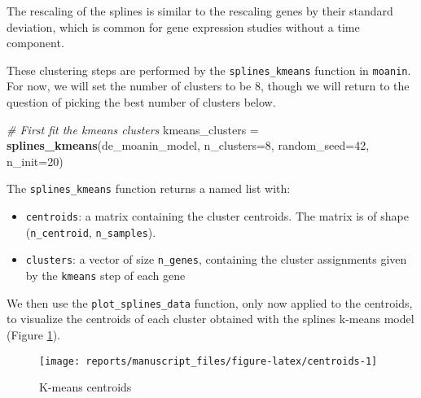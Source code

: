 \documentclass[9pt,a4paper,]{extarticle}
\newenvironment{Shaded}{\begin{snugshade}}{\end{snugshade}}
\newcommand{\CommentTok}[1]{\textcolor[rgb]{0.56,0.35,0.01}{\textit{#1}}}
\newcommand{\DataTypeTok}[1]{\textcolor[rgb]{0.13,0.29,0.53}{#1}}
\newcommand{\DecValTok}[1]{\textcolor[rgb]{0.00,0.00,0.81}{#1}}
\newcommand{\KeywordTok}[1]{\textcolor[rgb]{0.13,0.29,0.53}{\textbf{#1}}}
\newcommand{\NormalTok}[1]{#1}
\newcommand{\OperatorTok}[1]{\textcolor[rgb]{0.81,0.36,0.00}{\textbf{#1}}}
\newcommand{\OtherTok}[1]{\textcolor[rgb]{0.56,0.35,0.01}{#1}}
\newcommand{\StringTok}[1]{\textcolor[rgb]{0.31,0.60,0.02}{#1}}
\begin{document}
The rescaling of the splines is similar to the rescaling genes by their standard deviation, which is common for gene expression studies without a time component.

These clustering steps are performed by the \texttt{splines\_kmeans}
function in \texttt{moanin}. For now, we will set the number of clusters to be \(8\), though we
will return to the question of picking the best number of clusters below.

\begin{Shaded}
\begin{Highlighting}[]
\CommentTok{# First fit the kmeans clusters}
\NormalTok{kmeans_clusters =}\StringTok{ }\KeywordTok{splines_kmeans}\NormalTok{(de_moanin_model, }\DataTypeTok{n_clusters=}\DecValTok{8}\NormalTok{,}
    \DataTypeTok{random_seed=}\DecValTok{42}\NormalTok{,}
    \DataTypeTok{n_init=}\DecValTok{20}\NormalTok{)}
\end{Highlighting}
\end{Shaded}

The \texttt{splines\_kmeans} function returns a named list with:

\begin{itemize}
\tightlist
\item
  \texttt{centroids}: a matrix containing the cluster centroids. The matrix is of
  shape (\texttt{n\_centroid}, \texttt{n\_samples}).
\item
  \texttt{clusters}: a vector of size \texttt{n\_genes}, containing the cluster assignments given by the \texttt{kmeans} step of each gene
\end{itemize}

We then use the \texttt{plot\_splines\_data} function, only now applied to the
centroids, to visualize the centroids of each cluster obtained with the
splines k-means model (Figure \ref{fig:centroids}).

\begin{Shaded}
\end{Shaded}

\begin{figure}[H]

{\centering \texttt{[image: reports/manuscript\_files/figure-latex/centroids-1]} 

}

\caption{K-means centroids}\label{fig:centroids}
\end{figure}
\end{document}

